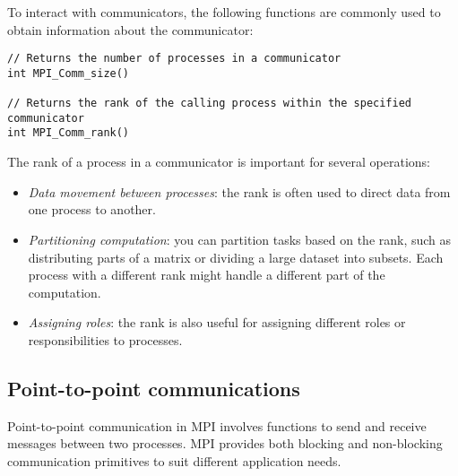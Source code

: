 To interact with communicators, the following functions are commonly used to obtain information about the communicator:
\begin{lstlisting}[style=C]
// Returns the number of processes in a communicator
int MPI_Comm_size()

// Returns the rank of the calling process within the specified communicator
int MPI_Comm_rank()
\end{lstlisting}
The rank of a process in a communicator is important for several operations:
\begin{itemize}
    \item \textit{Data movement between processes}: the rank is often used to direct data from one process to another.
    \item \textit{Partitioning computation}: you can partition tasks based on the rank, such as distributing parts of a matrix or dividing a large dataset into subsets. 
        Each process with a different rank might handle a different part of the computation.
    \item \textit{Assigning roles}: the rank is also useful for assigning different roles or responsibilities to processes.
\end{itemize}

\subsection{Point-to-point communications}
Point-to-point communication in MPI involves functions to send and receive messages between two processes. 
MPI provides both blocking and non-blocking communication primitives to suit different application needs.

